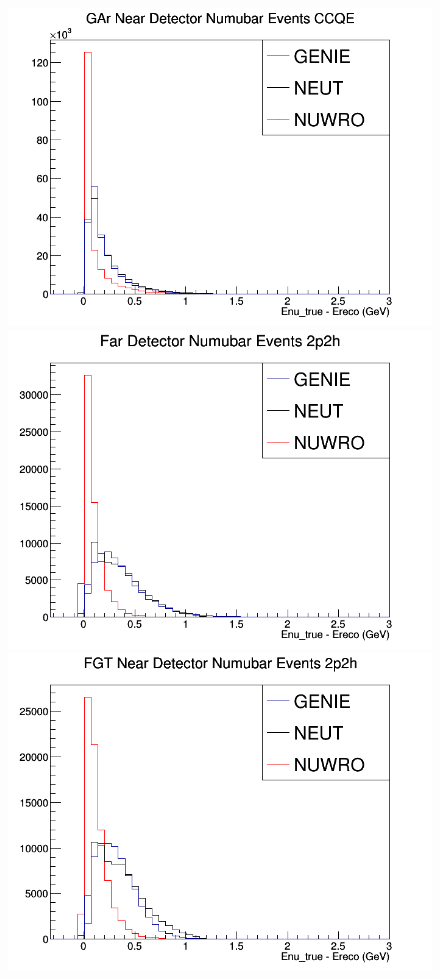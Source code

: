 \begin{figure}[h]
\endminipage
{}
\includegraphics[width=\linewidth]{Ereco_Etrue/numubar_GAr_CCQE.png}
\endminipage
\newline
{}
\includegraphics[width=\linewidth]{Ereco_Etrue/numubar_FD_2p2h.png}
\endminipage
{}
\includegraphics[width=\linewidth]{Ereco_Etrue/numubar_FGT_2p2h.png}

\end{figure}
